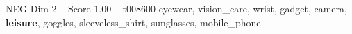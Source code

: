 \begin{textsample}{NEG Dim 2 – Score 1.00 – t008600}  \label{ex:f2_neg_019}
eyewear, vision\_care, wrist, gadget, camera, \textbf{leisure}, goggles, sleeveless\_shirt, sunglasses, mobile\_phone

\end{textsample}
